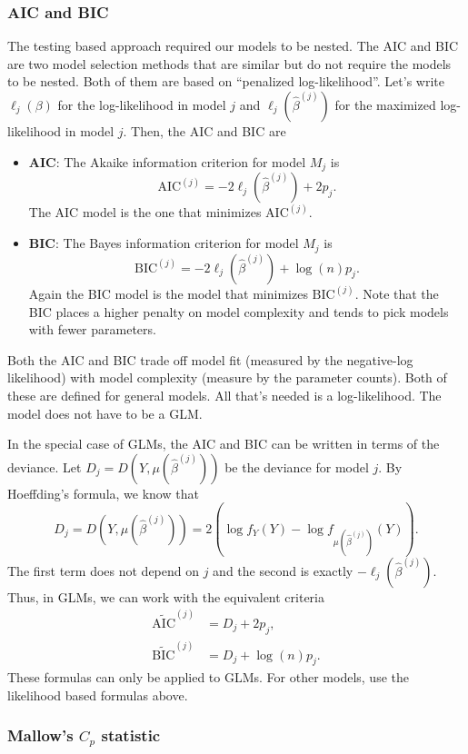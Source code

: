 \subsubsection*{AIC and BIC}

The testing based approach required our models to be nested. The AIC and BIC are two model selection methods that are similar but do not require the models to be nested. Both of them are based on ``penalized log-likelihood''. Let's write $\ell_j(\beta)$ for the log-likelihood in model $j$ and $\ell_j(\hat{\beta}^{(j)})$ for the maximized log-likelihood in model $j$. Then, the AIC and BIC are 
\begin{itemize}
    \item \textbf{AIC}: The Akaike information criterion for model $M_j$ is \[\mathrm{AIC}^{(j)} = -2\ell_j(\hat{\beta}^{(j)}) +2p_j.\] 
    The AIC model is the one that minimizes $\mathrm{AIC}^{(j)}$.
    \item \textbf{BIC}: The Bayes information criterion for model $M_j$ is 
    \[\mathrm{BIC}^{(j)} = -2\ell_j(\hat{\beta}^{(j)})  + \log(n)p_j.\] 
    Again the BIC model is the model that minimizes $\mathrm{BIC}^{(j)}$. Note that the BIC places a higher penalty on model complexity and tends to pick models with fewer parameters.  
\end{itemize}
Both the AIC and BIC trade off model fit (measured by the negative-log likelihood) with model complexity (measure by the parameter counts). Both of these are defined for general models. All that's needed is a log-likelihood. The model does not have to be a GLM.


In the special case of GLMs, the AIC and BIC can be written in terms of the deviance. Let $D_j = D(Y,\mu(\hat{\beta}^{(j)}))$ be the deviance for model $j$. By Hoeffding's formula, we know that
\[D_j = D(Y,\mu(\hat{\beta}^{(j)})) = 2\left(\log f_Y(Y) - \log f_{\mu(\hat{\beta}^{(j)})}(Y)\right). \]
The first term does not depend on $j$ and the second is exactly $-\ell_j(\hat{\beta}^{(j)})$. Thus, in GLMs, we can work with the equivalent criteria
\begin{align*}
    \widetilde{\mathrm{AIC}}^{(j)} &= D_j + 2p_j, \\
    \widetilde{\mathrm{BIC}}^{(j)} &= D_j +\log(n)p_j.
\end{align*}
These formulas can only be applied to GLMs. For other models, use the likelihood based formulas above.

\subsubsection*{Mallow's $C_p$ statistic}

